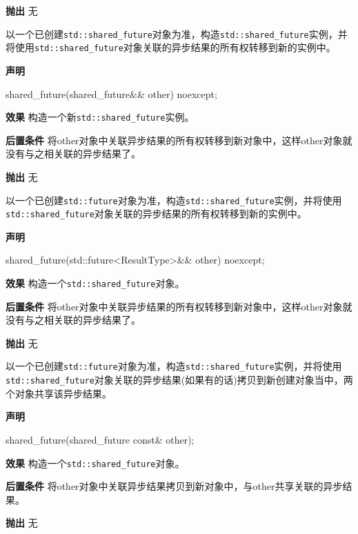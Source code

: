 \textbf{抛出}
无


以一个已创建\texttt{std::shared\_future}对象为准，构造\texttt{std::shared\_future}实例，并将使用\texttt{std::shared\_future}对象关联的异步结果的所有权转移到新的实例中。

\textbf{声明}

\begin{cpp}
shared_future(shared_future&& other) noexcept;
\end{cpp}

\textbf{效果}
构造一个新\texttt{std::shared\_future}实例。

\textbf{后置条件}
将other对象中关联异步结果的所有权转移到新对象中，这样other对象就没有与之相关联的异步结果了。

\textbf{抛出}
无


以一个已创建\texttt{std::future}对象为准，构造\texttt{std::shared\_future}实例，并将使用\texttt{std::shared\_future}对象关联的异步结果的所有权转移到新的实例中。

\textbf{声明}

\begin{cpp}
shared_future(std::future<ResultType>&& other) noexcept;
\end{cpp}

\textbf{效果}
构造一个\texttt{std::shared\_future}对象。

\textbf{后置条件}
将other对象中关联异步结果的所有权转移到新对象中，这样other对象就没有与之相关联的异步结果了。

\textbf{抛出}
无


以一个已创建\texttt{std::future}对象为准，构造\texttt{std::shared\_future}实例，并将使用\texttt{std::shared\_future}对象关联的异步结果(如果有的话)拷贝到新创建对象当中，两个对象共享该异步结果。

\textbf{声明}

\begin{cpp}
shared_future(shared_future const& other);
\end{cpp}

\textbf{效果}
构造一个\texttt{std::shared\_future}对象。

\textbf{后置条件}
将other对象中关联异步结果拷贝到新对象中，与other共享关联的异步结果。

\textbf{抛出}
无

